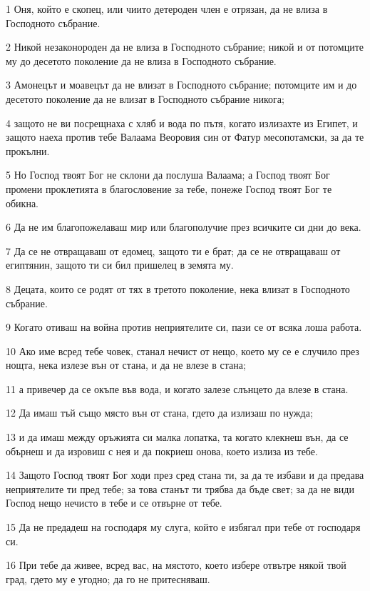 \par 1 Оня, който е скопец, или чиито детероден член е отрязан, да не влиза в Господното събрание.
\par 2 Никой незаконороден да не влиза в Господното събрание; никой и от потомците му до десетото поколение да не влиза в Господното събрание.
\par 3 Амонецът и моавецът да не влизат в Господното събрание; потомците им и до десетото поколение да не влизат в Господното събрание никога;
\par 4 защото не ви посрещнаха с хляб и вода по пътя, когато излизахте из Египет, и защото наеха против тебе Валаама Веоровия син от Фатур месопотамски, за да те прокълни.
\par 5 Но Господ твоят Бог не склони да послуша Валаама; а Господ твоят Бог промени проклетията в благословение за тебе, понеже Господ твоят Бог те обикна.
\par 6 Да не им благопожелаваш мир или благополучие през всичките си дни до века.
\par 7 Да се не отвращаваш от едомец, защото ти е брат; да се не отвращаваш от египтянин, защото ти си бил пришелец в земята му.
\par 8 Децата, които се родят от тях в третото поколение, нека влизат в Господното събрание.
\par 9 Когато отиваш на война против неприятелите си, пази се от всяка лоша работа.
\par 10 Ако име всред тебе човек, станал нечист от нещо, което му се е случило през нощта, нека излезе вън от стана, и да не влезе в стана;
\par 11 а привечер да се окъпе във вода, и когато залезе слънцето да влезе в стана.
\par 12 Да имаш тъй също място вън от стана, гдето да излизаш по нужда;
\par 13 и да имаш между оръжията си малка лопатка, та когато клекнеш вън, да се обърнеш и да изровиш с нея и да покриеш онова, което излиза из тебе.
\par 14 Защото Господ твоят Бог ходи през сред стана ти, за да те избави и да предава неприятелите ти пред тебе; за това станът ти трябва да бъде свет; за да не види Господ нещо нечисто в тебе и се отвърне от тебе.
\par 15 Да не предадеш на господаря му слуга, който е избягал при тебе от господаря си.
\par 16 При тебе да живее, всред вас, на мястото, което избере отвътре някой твой град, гдето му е угодно; да го не притесняваш.
